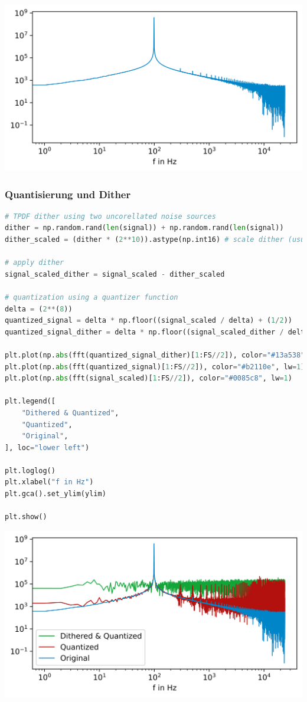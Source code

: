 \includegraphics{./img/1e13dd00896ca85aa126ad99dcde56632518d4b2.png}

\hypertarget{quantisierung-und-dither}{%
\subsubsection{Quantisierung und
Dither}\label{quantisierung-und-dither}}

\begin{lstlisting}[language=Python]
# TPDF dither using two uncorellated noise sources
dither = np.random.rand(len(signal)) + np.random.rand(len(signal))
dither_scaled = (dither * (2**10)).astype(np.int16) # scale dither (usually only to 1 LSB)

# apply dither
signal_scaled_dither = signal_scaled - dither_scaled

# quantization using a quantizer function
delta = (2**(8))
quantized_signal = delta * np.floor((signal_scaled / delta) + (1/2))
quantized_signal_dither = delta * np.floor((signal_scaled_dither / delta) + (1/2))

plt.plot(np.abs(fft(quantized_signal_dither)[1:FS//2]), color="#13a538", lw=1)
plt.plot(np.abs(fft(quantized_signal)[1:FS//2]), color="#b2110e", lw=1)
plt.plot(np.abs(fft(signal_scaled)[1:FS//2]), color="#0085c8", lw=1)

plt.legend([
    "Dithered & Quantized",
    "Quantized",
    "Original",
], loc="lower left")

plt.loglog()
plt.xlabel("f in Hz")
plt.gca().set_ylim(ylim)

plt.show()
\end{lstlisting}

\includegraphics{./img/41398359f293db667c0a2100ef0e24205531cfb0.png}

